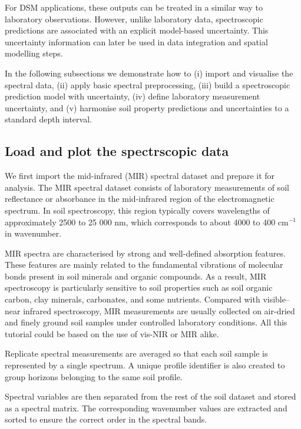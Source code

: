 \documentclass[
  10pt,
  b5paper,
  oneside]{book}
\begin{document}
For DSM applications, these outputs can be treated in a similar way to laboratory observations. However, unlike laboratory data, spectroscopic predictions are associated with an explicit model-based uncertainty. This uncertainty information can later be used in data integration and spatial modelling steps.

In the following subsections we demonstrate how to (i) import and visualise the spectral data, (ii) apply basic spectral preprocessing, (iii) build a spectroscopic prediction model with uncertainty, (iv) define laboratory measurement uncertainty, and (v) harmonise soil property predictions and uncertainties to a standard depth interval.

\subsection{Load and plot the spectrscopic data}\label{load-and-plot-the-spectrscopic-data}

We first import the mid-infrared (MIR) spectral dataset and prepare it for analysis. The MIR spectral dataset consists of laboratory measurements of soil reflectance or absorbance in the mid-infrared region of the electromagnetic spectrum. In soil spectroscopy, this region typically covers wavelengths of approximately 2500 to 25 000 nm, which corresponds to about 4000 to 400 cm\(^{-1}\) in wavenumber.

MIR spectra are characterised by strong and well-defined absorption features. These features are mainly related to the fundamental vibrations of molecular bonds present in soil minerals and organic compounds. As a result, MIR spectroscopy is particularly sensitive to soil properties such as soil organic carbon, clay minerals, carbonates, and some nutrients. Compared with visible--near infrared spectroscopy, MIR measurements are usually collected on air-dried and finely ground soil samples under controlled laboratory conditions. All this tutorial could be based on the use of vis-NIR or MIR alike.

Replicate spectral measurements are averaged so that each soil sample is represented by a single spectrum. A unique profile identifier is also created to group horizons belonging to the same soil profile.

Spectral variables are then separated from the rest of the soil dataset and stored as a spectral matrix. The corresponding wavenumber values are extracted and sorted to ensure the correct order in the spectral bands.
\end{document}
